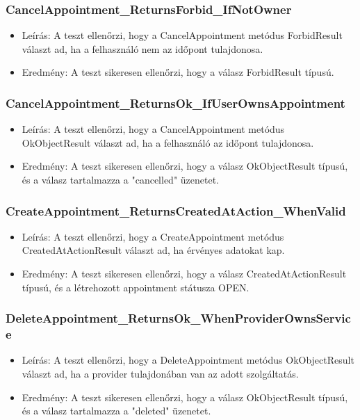 \documentclass[11pt]{article}
\begin{document}
\subsubsection{CancelAppointment\_ReturnsForbid\_IfNotOwner}
\label{sec:org8412c49}
\begin{itemize}
\item Leírás: A teszt ellenőrzi, hogy a CancelAppointment metódus ForbidResult választ ad, ha a felhasználó nem az időpont tulajdonosa.
\item Eredmény: A teszt sikeresen ellenőrzi, hogy a válasz ForbidResult típusú.
\end{itemize}
\subsubsection{CancelAppointment\_ReturnsOk\_IfUserOwnsAppointment}
\label{sec:orgfda3acf}
\begin{itemize}
\item Leírás: A teszt ellenőrzi, hogy a CancelAppointment metódus OkObjectResult választ ad, ha a felhasználó az időpont tulajdonosa.
\item Eredmény: A teszt sikeresen ellenőrzi, hogy a válasz OkObjectResult típusú, és a válasz tartalmazza a "cancelled" üzenetet.
\end{itemize}
\subsubsection{CreateAppointment\_ReturnsCreatedAtAction\_WhenValid}
\label{sec:org7f8a986}
\begin{itemize}
\item Leírás: A teszt ellenőrzi, hogy a CreateAppointment metódus CreatedAtActionResult választ ad, ha érvényes adatokat kap.
\item Eredmény: A teszt sikeresen ellenőrzi, hogy a válasz CreatedAtActionResult típusú, és a létrehozott appointment státusza OPEN.
\end{itemize}
\subsubsection{DeleteAppointment\_ReturnsOk\_WhenProviderOwnsService}
\label{sec:org6623788}
\begin{itemize}
\item Leírás: A teszt ellenőrzi, hogy a DeleteAppointment metódus OkObjectResult választ ad, ha a provider tulajdonában van az adott szolgáltatás.
\item Eredmény: A teszt sikeresen ellenőrzi, hogy a válasz OkObjectResult típusú, és a válasz tartalmazza a "deleted" üzenetet.
\end{itemize}
\end{document}
